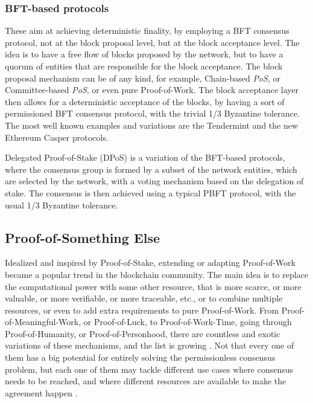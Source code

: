 \documentclass[journal]{IEEEtran}
\begin{document}
\subsubsection{BFT-based protocols}

These aim at achieving deterministic finality, by employing a BFT
consensus protocol, not at the block proposal level, but at the
block acceptance level. The idea is to have a free flow of blocks
proposed by the network, but to have a quorum of entities that
are responsible for the block acceptance. The block proposal mechanism
can be of any kind, for example, Chain-based \emph{PoS}, or Committee-based \emph{PoS},
or even pure Proof-of-Work. The block acceptance layer then allows
for a deterministic acceptance of the blocks, by having a sort of permissioned
BFT consensus protocol, with the trivial 1/3 Byzantine tolerance. The most well known examples
and variations are the Tendermint \cite{buchman2016tendermint} and the new Ethereum Casper 
\cite{buterin2017casper} protocols.

Delegated Proof-of-Stake (DPoS) is a variation of the BFT-based protocols,
where the consensus group is formed by a subset of the network entities,
which are selected by the network, with a voting mechanism based on the
delegation of stake. The consensus is then achieved using a typical 
PBFT protocol, with the usual 1/3 Byzantine tolerance.

\subsection{Proof-of-Something Else}

Idealized and inspired by Proof-of-Stake, extending or adapting Proof-of-Work
became a popular trend in the blockchain community. The main idea is to
replace the computational power with some other resource, that is
more scarce, or more valuable, or more verifiable, or more traceable, etc.,
or to combine multiple resources, or even to add extra requirements to 
pure Proof-of-Work. From Proof-of-Meaningful-Work, or Proof-of-Luck, 
to Proof-of-Work-Time, going through Proof-of-Humanity, or Proof-of-Personhood, there
are countless and exotic variations of these mechanisms, and the list is growing \cite{token-economy-gitbook, 9376868}.
Not that every one of them has a big potential for entirely solving the permissionless consensus problem,
but each one of them may tackle different use cases where consensus needs to be reached, 
and where different resources are available to make the agreement happen \cite{BOURAGA2021114384, 9376868}.
\end{document}
